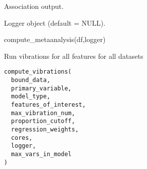 \documentclass[a4paper]{book}
\begin{document}
%
\begin{Arguments}
\begin{ldescription}
\item[\code{df}] Association output.

\item[\code{logger}] Logger object (default = NULL).
\end{ldescription}
\end{Arguments}
%
\begin{Examples}
\begin{ExampleCode}
compute_metaanalysis(df,logger)
\end{ExampleCode}
\end{Examples}
%
\begin{Description}\relax
Run vibrations for all features for all datasets
\end{Description}
%
\begin{Usage}
\begin{verbatim}
compute_vibrations(
  bound_data,
  primary_variable,
  model_type,
  features_of_interest,
  max_vibration_num,
  proportion_cutoff,
  regression_weights,
  cores,
  logger,
  max_vars_in_model
)
\end{verbatim}
\end{Usage}
%
\end{document}

